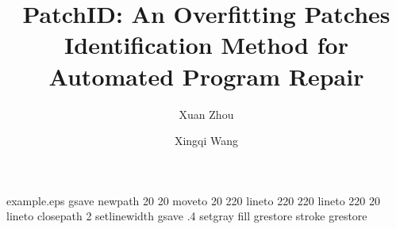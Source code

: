 %
%
%
%
%
\begin{filecontents*}{example.eps}
gsave
newpath
  20 20 moveto
  20 220 lineto
  220 220 lineto
  220 20 lineto
closepath
2 setlinewidth
gsave
  .4 setgray fill
grestore
stroke
grestore
\end{filecontents*}
%
\RequirePackage{fix-cm}
%
\documentclass[smallextended]{svjour3}       %
%
\smartqed  %
%
\usepackage{graphicx}
\usepackage{amsmath}
\usepackage{listings}
\usepackage{graphicx}
\usepackage{diagbox}
\usepackage{booktabs}
\usepackage{algorithm}
\usepackage{algorithmicx}
\usepackage{algpseudocode}
\usepackage{amssymb}
\usepackage[colorlinks,linkcolor=blue]{hyperref}
\usepackage{multirow}
%
%
%
%
%


\title{PatchID: An Overfitting Patches Identification Method for Automated Program Repair%
}



\author{Xuan Zhou         \and
        Xingqi Wang %
}

